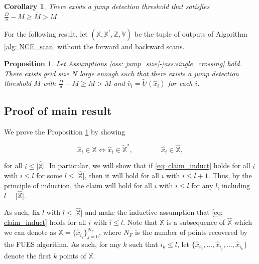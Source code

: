 \documentclass[12pt]{article}
\newtheorem{corollary}{Corollary}
\newtheorem{proposition}{Proposition}
\begin{document}
\begin{corollary}\label{corr:JDT}
There exists a jump detection threshold that satisfies $\frac{D}{\delta}-M \geq \bar{M} > M$.
\end{corollary}

For the following result, let $(\mathbb{X}, \mathbb{X}^{\prime}, \mathbb{Z}, \mathbb{V})$ be the tuple of outputs of Algorithm \ref{alg: NCE_scan} without the forward and backward scans.

\begin{proposition}\label{prop: main}
Let Assumptions \ref{ass: jump_size}-\ref{ass:single_crossing} hold. There exists grid size $N$ large enough such that there exists a jump detection threshold $\bar{M}$ with  $\frac{D}{\delta}-M \geq \bar{M} > M$ and
$\hat{v}_{i} = \widetilde{U}(\hat{x}_{i})$ for each $i$. 
\end{proposition}

\subsection{Proof of main result}


We prove the Proposition \ref{prop: main} by showing

\begin{equation}\label{eq: claim_induct}
 \hat{x}_{i} \in \mathbb{X} \Longleftrightarrow  \hat{x}_{i} \in \widetilde{\mathbb{X}}^{\star}, \qquad \qquad \hat{x}_{i}\in \hat{\mathbb{X}},
\end{equation}

for all  $i\leq \vert \hat{\mathbb{X}} \vert$. In particular, we will show that if \eqref{eq: claim_induct} holds for all $i$ with $i\leq l$ for some $l\leq \vert \hat{\mathbb{X}} \vert$, then it will hold for all $i$ with $i\leq l+1$. Thus, by the principle of induction, the claim will hold for all $i$ with $i\leq l$ for any $l$, including $l = \vert \hat{\mathbb{X}} \vert$.

As such, fix $l$ with $l \leq \vert \hat{\mathbb{X}}\vert$ and make the inductive assumption that \eqref{eq: claim_induct} holds for all $i$ with $i\leq l$. Note that $\mathbb{X}$ is a subsequence of $\hat{\mathbb{X}}$ which we can denote as $\mathbb{X} = \{\hat{x}_{i_j}\}_{j=0}^{N_{F}}$, where $N_{F}$ is the number of points recovered by the FUES algorithm. As such, for any $k$ such that $i_{k}\leq l$, let $\{\hat{x}_{i_0}, \dots, \hat{x}_{i_j},\dots, \hat{x}_{i_{k}}\}$ denote the first $k$ points of $\mathbb{X}$.
\end{document}
